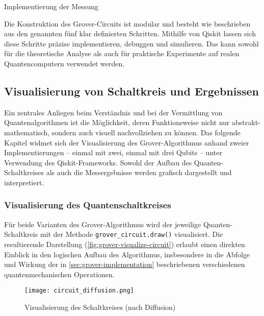 \begin{listing}[ht!]
  \inputminted{python}{code/grover-measure.py}
  \caption{Implementierung der Messung}
  \label{code:grover-measure}
\end{listing}
 
Die Konstruktion des Grover-Circuits ist modular und besteht wie beschrieben aus den genannten fünf klar definierten Schritten. Mithilfe von Qiskit lassen sich diese Schritte präzise implementieren, debuggen und simulieren. Das kann sowohl für die theoretische Analyse als auch für praktische Experimente auf realen Quantencomputern verwendet werden. \autocite{ibm_quantum_2025} \autocite{noauthor_grovers_nodate}

\subsection{Visualisierung von Schaltkreis und Ergebnissen}

Ein zentrales Anliegen beim Verständnis und bei der Vermittlung von Quantenalgorithmen ist die Möglichkeit, deren Funktionsweise nicht nur abstrakt-mathematisch, sondern auch visuell nachvollziehen zu können. Das folgende Kapitel widmet sich der Visualisierung des Grover-Algorithmus anhand zweier Implementierungen – einmal mit zwei, einmal mit drei Qubits – unter Verwendung des Qiskit-Frameworks. Sowohl der Aufbau des Quanten-Schaltkreises als auch die Messergebnisse werden grafisch dargestellt und interpretiert.

\subsubsection*{Visualisierung des Quantenschaltkreises}
\label{sec:grover-visualization}

Für beide Varianten des Grover-Algorithmus wird der jeweilige Quanten-Schaltkreis mit der Methode \texttt{grover_circuit.draw()} visualisiert. Die resultierende Darstellung (\autoref{fig:grover-visualize-circuit}) erlaubt einen direkten Einblick in den logischen Aufbau des Algorithmus, insbesondere in die Abfolge und Wirkung der in \autoref{sec:grover-implementation} beschriebenen verschiedenen quantenmechanischen Operationen.

\begin{figure}
      \texttt{[image: circuit\_diffusion.png]}
      \caption{Visualisierung des Schaltkreises (nach Diffusion)}
      \label{fig:grover-visualize-circuit}
\end{figure}

